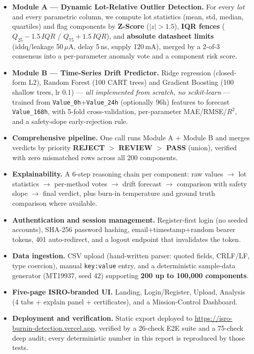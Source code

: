 \documentclass[11pt,a4paper]{article}
\newcommand{\code}[1]{\texttt{\small #1}}
\newcommand{\keys}[1]{\textbf{\sffamily#1}}
\begin{document}
\begin{itemize}[leftmargin=1.5em]
  \item \textbf{Module A --- Dynamic Lot-Relative Outlier Detection.}
        For every \emph{lot} and every parametric column, we compute lot statistics (mean, std,
        median, quartiles) and flag components by \textbf{Z-Score} ($|z|>1.5$), \textbf{IQR fences}
        ($Q_{25}-1.5\,IQR$ / $Q_{75}+1.5\,IQR$), and \textbf{absolute datasheet limits}
        (iddq/leakage 50\,$\mu$A, delay 5\,ns, supply 120\,mA), merged by a 2-of-3 consensus into a
        per-parameter anomaly vote and a component risk score.
  \item \textbf{Module B --- Time-Series Drift Predictor.}
        Ridge regression (closed-form L2), Random Forest (100 CART trees) and Gradient Boosting
        (100 shallow trees, lr 0.1) --- \emph{all implemented from scratch, no scikit-learn} ---
        trained from \code{Value\_0h}+\code{Value\_24h} (optionally 96h) features to forecast
        \code{Value\_168h}, with 5-fold cross-validation, per-parameter MAE/RMSE/$R^2$, and a
        safety-slope early-rejection rule.
  \item \textbf{Comprehensive pipeline.} One call runs Module A + Module B and merges verdicts by
        priority \keys{REJECT} $>$ \keys{REVIEW} $>$ \keys{PASS} (union), verified with zero
        mismatched rows across all 200 components.
  \item \textbf{Explainability.} A 6-step reasoning chain per component: raw values $\rightarrow$
        lot statistics $\rightarrow$ per-method votes $\rightarrow$ drift forecast $\rightarrow$
        comparison with safety slope $\rightarrow$ final verdict, plus burn-in temperature and ground
        truth comparison where available.
  \item \textbf{Authentication and session management.} Register-first login (no seeded accounts),
        SHA-256 password hashing, email+timestamp+random bearer tokens, 401 auto-redirect, and a
        logout endpoint that invalidates the token.
  \item \textbf{Data ingestion.} CSV upload (hand-written parser: quoted fields, CRLF/LF, type
        coercion), manual \code{key:value} entry, and a deterministic sample-data generator
        (MT19937, seed 42) supporting \textbf{200 up to 100{,}000 components}.
  \item \textbf{Five-page ISRO-branded UI.} Landing, Login/Register, Upload, Analysis (4 tabs +
        explain panel + certificates), and a Mission-Control Dashboard.
  \item \textbf{Deployment and verification.} Static export deployed to
        \url{https://isro-burnin-detection.vercel.app}, verified by a 26-check E2E suite and a
        75-check deep audit; every deterministic number in this report is reproduced by those tests.
\end{itemize}
\end{document}
